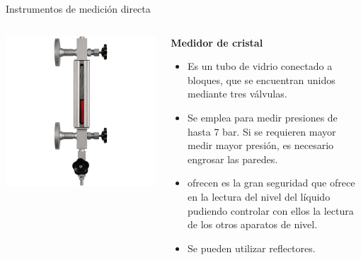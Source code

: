 \documentclass[aspectratio=169]{beamer}
\begin{document}
\begin{frame}{Instrumentos de medición directa}
    \begin{columns}[c, onlytextwidth]
        \begin{column}{0.45\textwidth}
        \includegraphics[width = 1\linewidth]{fig/Nivel/medidor_cristal.png}
        \end{column}
        \begin{column}{0.50\textwidth}
        \textbf{Medidor de cristal}
            \begin{itemize}
                \item Es un tubo de vidrio conectado a bloques, que se encuentran unidos mediante tres válvulas.
                \item Se emplea para medir presiones de hasta 7 bar. Si se requieren mayor medir mayor presión, es necesario engrosar las paredes.   
                \item ofrecen es la gran seguridad que ofrece en la lectura del nivel del líquido pudiendo controlar con ellos la lectura de los otros aparatos de nivel.
                \item Se pueden utilizar reflectores.
            \end{itemize}
            
        \end{column}
    \end{columns}
\end{frame}
\end{document}
